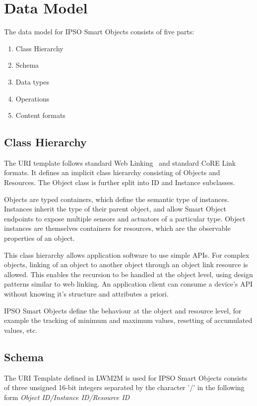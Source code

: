 \documentclass[peerreview, a4paper, 7pt]{IEEEtran}
\begin{document}
\section{Data Model} 

The data model for IPSO Smart Objects consists of five parts:

\begin{enumerate}
\item Class Hierarchy
\item Schema
\item Data types 
\item Operations 
\item Content formats
\end{enumerate}

\subsection{Class Hierarchy}

The URI template follows standard Web Linking~\cite{rfc5988} and standard CoRE Link~\cite{rfc6690} formats. It defines an implicit class hierarchy consisting of Objects and Resources. The Object class is further split into ID and Instance subclasses. 

Objects are typed containers, which define the semantic type of instances. Instances inherit the type of their parent object, and allow Smart Object endpoints to expose multiple sensors and actuators of a particular type. Object instances are themselves containers for resources, which are the observable properties of an object. 

This class hierarchy allows application software to use simple APIs. For complex objects, linking of an object to another object through an object link resource is allowed. This enables the recursion to be handled at the object level, using design patterns similar to web linking. An application client can consume a device's API without knowing it's structure and attributes a priori.

IPSO Smart Objects define the behaviour at the object and resource level, for example the tracking of minimum and maximum values, resetting of accumulated values, etc.

\subsection{Schema}

The URI Template defined in LWM2M is used for IPSO Smart Objects consists of three unsigned 16-bit integers separated by the character '/' in the following form \textit{Object ID/Instance ID/Resource ID}
\end{document}
